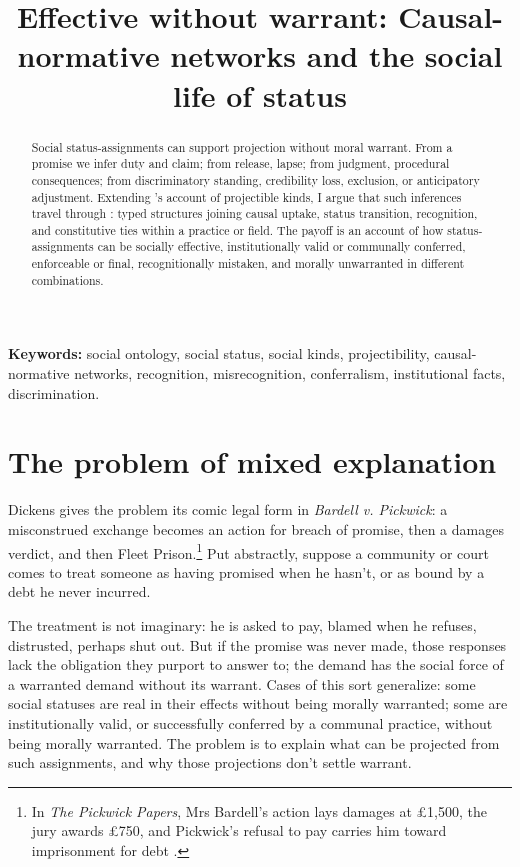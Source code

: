 \documentclass[12pt]{article}
\title{Effective without warrant: Causal-normative networks and the social life of status}
\author{}
\date{}
\begin{document}
\maketitle

\begin{abstract}
Social status-assignments can support projection without moral warrant. From a promise we infer duty and claim; from release, lapse; from judgment, procedural consequences; from discriminatory standing, credibility loss, exclusion, or anticipatory adjustment. Extending \textcite{khalidi2018nodes}'s account of projectible kinds, I argue that such inferences travel through : typed structures joining causal uptake, status transition, recognition, and constitutive ties within a practice or field. The payoff is an account of how status-assignments can be socially effective, institutionally valid or communally conferred, enforceable or final, recognitionally mistaken, and morally unwarranted in different combinations.
\end{abstract}

\noindent\textbf{Keywords:} social ontology, social status, social kinds, projectibility, causal-normative networks, recognition, misrecognition, conferralism, institutional facts, discrimination.

\section{The problem of mixed explanation}
\label{sec:problem}

Dickens gives the problem its comic legal form in \emph{Bardell v. Pickwick}: a misconstrued exchange becomes an action for breach of promise, then a damages verdict, and then Fleet Prison.\footnote{In \emph{The Pickwick Papers}, Mrs Bardell's action lays damages at \pounds 1,500, the jury awards \pounds 750, and Pickwick's refusal to pay carries him toward imprisonment for debt \citep[chaps.~26, 34, 40--41]{dickens1837PickwickPapers}.} Put abstractly, suppose a community or court comes to treat someone as having promised when he hasn't, or as bound by a debt he never incurred.

The treatment is not imaginary: he is asked to pay, blamed when he refuses, distrusted, perhaps shut out. But if the promise was never made, those responses lack the obligation they purport to answer to; the demand has the social force of a warranted demand without its warrant. Cases of this sort generalize: some social statuses are real in their effects without being morally warranted; some are institutionally valid, or successfully conferred by a communal practice, without being morally warranted. The problem is to explain what can be projected from such assignments, and why those projections don't settle warrant.
\end{document}
